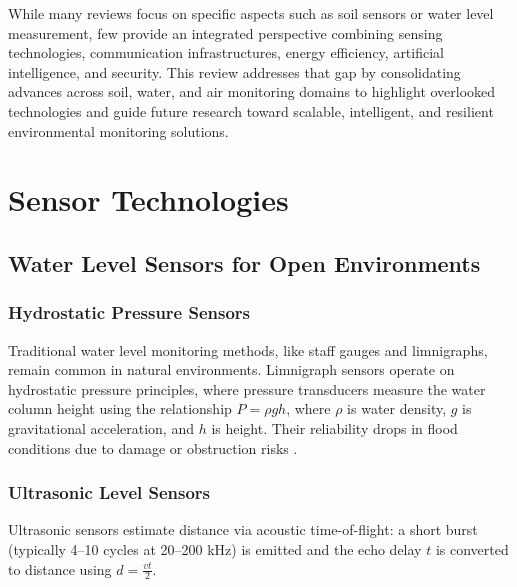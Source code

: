 \documentclass[conference]{IEEEtran}
\begin{document}

While many reviews focus on specific aspects such as soil sensors or water level measurement, few provide an integrated perspective combining sensing technologies, communication infrastructures, energy efficiency, artificial intelligence, and security. This review addresses that gap by consolidating advances across soil, water, and air monitoring domains to highlight overlooked technologies and guide future research toward scalable, intelligent, and resilient environmental monitoring solutions.

\section{Sensor Technologies} \label{cap:sensors}

\subsection{Water Level Sensors for Open Environments} \label{subsec:water_level_sensors}

\subsubsection{Hydrostatic Pressure Sensors}
Traditional water level monitoring methods, like staff gauges and limnigraphs, remain common in natural environments. Limnigraph sensors operate on hydrostatic pressure principles, where pressure transducers measure the water column height using the relationship $P = \rho gh$, where $\rho$ is water density, $g$ is gravitational acceleration, and $h$ is height. Their reliability drops in flood conditions due to damage or obstruction risks \cite{santana_2024_development}.

\subsubsection{Ultrasonic Level Sensors}
Ultrasonic sensors estimate distance via acoustic time-of-flight: a short burst (typically 4--10 cycles at 20--200 kHz) is emitted and the echo delay $t$ is converted to distance using $d = \frac{vt}{2}$.
\end{document}
